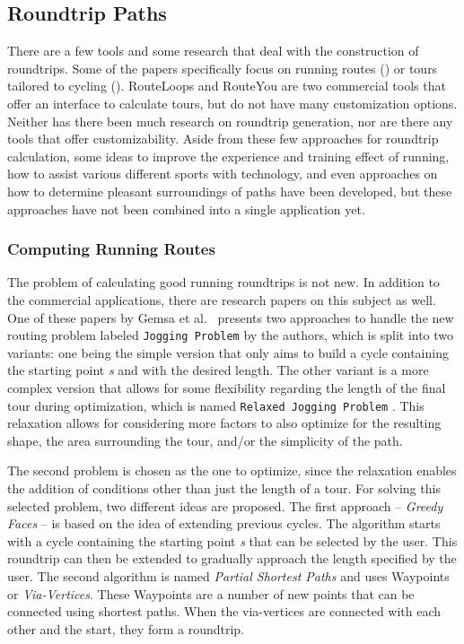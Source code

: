 \subsection{Roundtrip Paths}
\label{subsec:Roudtrip}
There are a few tools and some research that deal with the construction of roundtrips.
Some of the papers specifically focus on running routes (\cite{gemsa_efficient_2013, pajor_algorithm_2013}) or tours tailored to cycling (\cite{ehrgott_bi-objective_2012, verbeeck_extension_2014}).
RouteLoops and RouteYou are two commercial tools that offer an interface to calculate tours, but do not have many customization options.
Neither has there been much research on roundtrip generation, nor are there any tools that offer customizability.
Aside from these few approaches for roundtrip calculation, some ideas to improve the experience and training effect of running, how to assist various different sports with technology, and even approaches on how to determine pleasant surroundings of paths have been developed, but these approaches have not been combined into a single application yet.



\subsubsection{Computing Running Routes}
\label{subsubsec:runningRoutes}

The problem of calculating good running roundtrips is not new.
In addition to the commercial applications, there are research papers on this subject as well.
One of these papers by Gemsa et al.\ \cite{gemsa_efficient_2013} presents two approaches to handle the new routing problem labeled \texttt{Jogging Problem} by the authors, which is split into two variants: 
one being the simple version that only aims to build a cycle containing the starting point \textit{s} and with the desired length.
The other variant is a more complex version that allows for some flexibility regarding the length of the final tour during optimization, which is named \texttt{Relaxed Jogging Problem} \cite{gemsa_efficient_2013}. 
This relaxation allows for considering more factors to also optimize for the resulting shape, the area surrounding the tour, and/or the simplicity of the path. 

The second problem is chosen as the one to optimize, since the relaxation enables the addition of conditions other than just the length of a tour.
For solving this selected problem, two different ideas are proposed.
The first approach -- \textit{Greedy Faces} -- is based on the idea of extending previous cycles.
The algorithm starts with a cycle containing the starting point \textit{s} that can be selected by the user. 
This roundtrip can then be extended to gradually approach the length specified by the user. 
The second algorithm is named \textit{Partial Shortest Paths} and uses Waypoints or \textit{Via-Vertices}.
These Waypoints are a number of new points that can be connected using shortest paths.
When the via-vertices are connected with each other and the start, they form a roundtrip.


